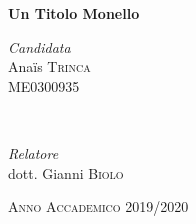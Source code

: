 \begin{titlepage}
\begin{center}
	
	\vfill
	
	{\huge\bfseries Un Titolo Monello}\\[0.2cm] %
	
	\vfill
	
	
	\begin{minipage}{0.4\textwidth}
		\begin{flushleft}
			\large
			\textit{Candidata}\\
			Ana\"is \textsc{Trinca}\\ %
			\small{ME0300935}
		\end{flushleft}
	\end{minipage}
	~
	\begin{minipage}{0.4\textwidth}
		\begin{flushright}
			\large
			\textit{Relatore}\\
			dott. Gianni \textsc{Biolo} %
		\end{flushright}
	\end{minipage}
	
	
	
	\vfill\vfill\vfill %
	
	{\large \textsc{Anno Accademico 2019/2020}} %
	
	\vfill %
	\end{center}
\end{titlepage}

